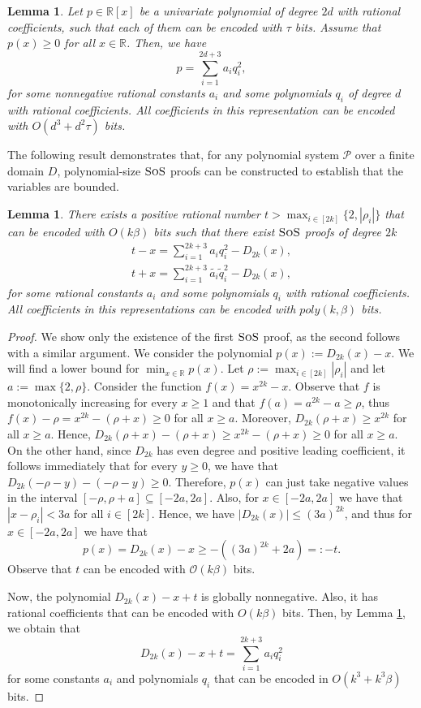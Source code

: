\documentclass[11pt]{article}
\newcommand{\sos}{\text{\sc{SoS}}}
\newcommand{\1}{\textbf{1}}
\newtheorem{lemma}[theorem]{Lemma}
\begin{document}
\begin{lemma}\label{lemma-rational-sq}\cite[Section 4, Thm 23]{magron-schwei}
    Let $p\in \mathbb{R}[x]$ be a univariate polynomial of degree $2d$ with rational coefficients, such that each of them can be encoded with $\tau$ bits. Assume that $p(x)\geq 0$ for all $x\in \mathbb{R}$. Then, we have 
    $$p=\sum_{i=1}^{2d+3}a_iq_i^2,$$
    for some nonnegative rational constants $a_i$ and some polynomials $q_i$ of degree $d$ with rational coefficients. All coefficients in this representation can be encoded with ${O}(d^3 +d^2\tau)$ bits.
\end{lemma}
%
The following result demonstrates that, for any polynomial system \(\mathcal{P}\) over a finite domain \(D\), polynomial-size \(\sos\) proofs can be constructed to establish that the variables are bounded.
\begin{lemma}\label{lemma-new-t}
    There exists a positive rational number $t>\max_{i\in [2k]}\{2,|\rho_i|\}$ that can be encoded with ${O}(k\beta)$ bits such that there exist $\sos$ proofs of degree $2k$
    \begin{align}
        t-x = \sum_{i=1}^{2k+3}a_iq_i^2 - D_{2k}(x), \\
        t+x = \sum_{i=1}^{2k+3}\tilde{a_i}\tilde{q}_i^2 - D_{2k}(x),
    \end{align}
 for some rational constants $a_i$ and some polynomials $q_i$ with rational coefficients. All coefficients in this representations can be encoded with $poly(k,\beta)$ bits.
\end{lemma}
\begin{proof}
    We show only the existence of the first $\sos$ proof, as the second follows with a similar argument. We consider the polynomial $p(x):= D_{2k}(x)-x$. We will find a lower bound for $\min_{x\in \mathbb{R}} p(x)$. Let $\rho := \max_{i\in [2k]}|\rho_i|$ and let $a := \max\{2, \rho\}$. Consider the function $f(x) = x^{2k} - x$. Observe that $f$ is monotonically increasing for every $x \geq 1$ and that $f(a) = a^{2k} - a \geq \rho$, thus $f(x) - \rho = x^{2k} - (\rho + x) \geq 0$ for all $x \geq a$. Moreover, $D_{2k}(\rho + x) \geq x^{2k}$ for all $x \geq a$. Hence, $D_{2k}(\rho + x)-(\rho+x) \geq x^{2k} - (\rho+x) \geq 0$ for all $x\geq a$. On the other hand, since $D_{2k}$ has even degree and positive leading coefficient, it follows immediately that for every $y \geq 0$, we have that $D_{2k}(-\rho-y)-(-\rho-y)\geq 0$. Therefore, $p(x)$ can just take negative values in the interval $[-\rho,\rho+a] \subseteq [-2a, 2a]$. Also, for $x\in [-2a,2a]$ we have that $|x-\rho_i|<3a$ for all $i\in[2k]$. Hence, we have $|D_{2k}(x)|\leq (3a)^{2k}$, and thus for $x\in [-2a,2a]$ we have that
    $$p(x)= D_{2k}(x)- x \geq -((3a)^{2k}+2a)=:-t.$$
    Observe that $t$ can be encoded with $\mathcal{O}(k\beta)$ bits.

    Now, the polynomial $D_{2k}(x)-x+t$ is globally nonnegative. Also, it has rational coefficients that can be encoded with $O(k\beta)$ bits. Then, by Lemma \ref{lemma-rational-sq}, we obtain that 
    $$D_{2k}(x)-x+t = \sum_{i=1}^{2k+3}a_iq_i^2 $$
    for some constants $a_i$ and polynomials $q_i$ that can be encoded in $O(k^3 + k^3\beta)$ bits.
\end{proof}
\end{document}
